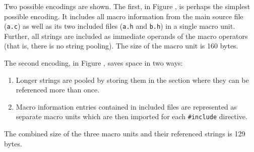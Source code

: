 Two possible encodings are shown. The first, in 
Figure , is perhaps the simplest
possible encoding. It includes all macro information from the
main source file (\texttt{a.c}) as well as its two included files
(\texttt{a.h} and \texttt{b.h}) in a single macro unit. Further,
all strings are included as immediate operands of the macro
operators (that is, there is no string pooling). The size
of the macro unit is 160 bytes.

The second encoding, in 
Figure ,
saves space in two ways:
\begin{enumerate}[1. ]
\item Longer strings are pooled by storing them in the
\dotdebugstr{} section where they can be referenced more than
once.

\item Macro information entries contained in included files
are represented as separate macro units which are then
imported for each \texttt{\#include} directive.

\end{enumerate}
The combined size of the three macro units and their referenced
strings is 129 bytes.

